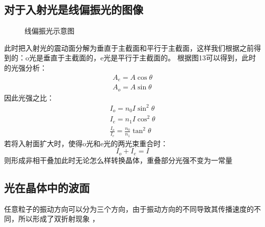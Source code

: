 \documentclass[UFT8]{article}
\begin{document}
\subsection{对于入射光是线偏振光的图像}
\begin{figure}[htbp]
\begin{center}
\end{center}
\caption{线偏振光示意图}
\end{figure}
此时把入射光的震动面分解为垂直于主截面和平行于主截面，这样我们根据之前得到的：o光是垂直于主截面的，e光是平行于主截面的。
根据图13可以得到，此时的光强分析：
\begin{gather*}
A_e=A\cos \theta\\
A_o=A\sin \theta
\end{gather*}
因此光强之比：
\begin{gather*}
I_o=n_0I\sin^2 \theta\\
I_e=n_1I\cos ^2\theta\\
\frac{I_o}{I_e}=\frac{n_0}{n_1}\tan^2\theta
\end{gather*}
若将入射面扩大时，使得o光和e光的两光束重合时：
\[
	I_o+I_e=I
\]
则形成非相干叠加此时无论怎么样转换晶体，重叠部分光强不变为一常量
\subsection{光在晶体中的波面}
任意粒子的振动方向可以分为三个方向，由于振动方向的不同导致其传播速度的不同，所以形成了双折射现象
，
\end{document}
